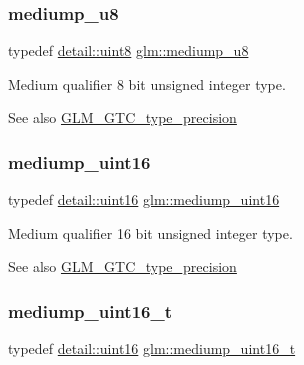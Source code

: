 \subsubsection{\texorpdfstring{mediump\+\_\+u8}{mediump\_u8}}
{\footnotesize\ttfamily typedef \hyperlink{namespaceglm_1_1detail_aef2588f97d090cc19fbbe0c74fe17c8f}{detail\+::uint8} \hyperlink{group__gtc__type__precision_gac04b372784392e82bd557f300c4de097}{glm\+::mediump\+\_\+u8}}

Medium qualifier 8 bit unsigned integer type. \begin{DoxySeeAlso}{See also}
\hyperlink{group__gtc__type__precision}{G\+L\+M\+\_\+\+G\+T\+C\+\_\+type\+\_\+precision} 
\end{DoxySeeAlso}
\mbox{\label{group__gtc__type__precision_ga2cef3a0d7b0fce75c9885f64656d8933}} 
\subsubsection{\texorpdfstring{mediump\+\_\+uint16}{mediump\_uint16}}
{\footnotesize\ttfamily typedef \hyperlink{namespaceglm_1_1detail_a47b2a7d006d187338e8031a352d1ce56}{detail\+::uint16} \hyperlink{group__gtc__type__precision_ga2cef3a0d7b0fce75c9885f64656d8933}{glm\+::mediump\+\_\+uint16}}

Medium qualifier 16 bit unsigned integer type. \begin{DoxySeeAlso}{See also}
\hyperlink{group__gtc__type__precision}{G\+L\+M\+\_\+\+G\+T\+C\+\_\+type\+\_\+precision} 
\end{DoxySeeAlso}
\mbox{\label{group__gtc__type__precision_ga0b385466deac5ac96061ef2cdd6db20f}} 
\subsubsection{\texorpdfstring{mediump\+\_\+uint16\+\_\+t}{mediump\_uint16\_t}}
{\footnotesize\ttfamily typedef \hyperlink{namespaceglm_1_1detail_a47b2a7d006d187338e8031a352d1ce56}{detail\+::uint16} \hyperlink{group__gtc__type__precision_ga0b385466deac5ac96061ef2cdd6db20f}{glm\+::mediump\+\_\+uint16\+\_\+t}}


